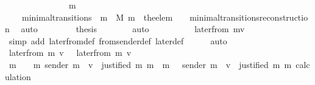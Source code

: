\begin{isabellebody}
\ \ \isamarkupfalse%
\ {\isacharminus}\isanewline
\ \ \ \ \isamarkupfalse%
\ {\isachardoublequoteopen}{\isasymsigma}{\isacharprime}\ {\isacharequal}\ \ {\isasymsigma}\ {\isasymunion}\ {\isacharbraceleft}m{\isacharprime}{\isacharbraceright}{\isachardoublequoteclose}\isanewline
\ \ \ \ \ \ \isamarkupfalse%
\ {\isacartoucheopen}{\isacharparenleft}{\isasymsigma}{\isacharcomma}\ {\isasymsigma}{\isacharprime}{\isacharparenright}\ {\isasymin}\ minimal{\isacharunderscore}transitions\ {\isasymand}\ m\ {\isasymin}\ M{\isacartoucheclose}\ {\isacartoucheopen}m{\isacharprime}\ {\isacharequal}\ the{\isacharunderscore}elem\ {\isacharparenleft}{\isasymsigma}{\isacharprime}\ {\isacharminus}\ {\isasymsigma}{\isacharparenright}{\isacartoucheclose}\ minimal{\isacharunderscore}transitions{\isacharunderscore}reconstruction\ \isamarkupfalse%
\ auto\ \isanewline
\ \ \ \ \isamarkupfalse%
\ \isamarkupfalse%
\ {\isacharquery}thesis\isanewline
\ \ \ \ \ \ \isamarkupfalse%
\ auto\isanewline
\ \ \isamarkupfalse%
\isanewline
\ \ \isamarkupfalse%
\ \isamarkupfalse%
\ {\isachardoublequoteopen}{\isasymdots}\ {\isacharequal}\ later{\isacharunderscore}from\ {\isacharparenleft}m{\isacharcomma}v{\isacharcomma}{\isasymsigma}{\isacharprime}{\isacharparenright}{\isachardoublequoteclose}\isanewline
\ \ \ \ \isamarkupfalse%
\ {\isacharparenleft}simp\ add{\isacharcolon}\ later{\isacharunderscore}from{\isacharunderscore}def\ from{\isacharunderscore}sender{\isacharunderscore}def\ later{\isacharunderscore}def{\isacharparenright}\isanewline
\ \ \ \ \isamarkupfalse%
\ auto\isanewline
\ \ \isamarkupfalse%
\ \isamarkupfalse%
\ {\isachardoublequoteopen}later{\isacharunderscore}from\ {\isacharparenleft}m{\isacharcomma}\ v{\isacharcomma}\ {\isasymsigma}{\isacharparenright}\ {\isacharequal}\ later{\isacharunderscore}from\ {\isacharparenleft}m{\isacharcomma}\ v{\isacharcomma}\ {\isasymsigma}{\isacharprime}{\isacharparenright}{\isachardoublequoteclose}\isanewline
\ \ \ \ \isamarkupfalse%
\ {\isacartoucheopen}{\isacharbraceleft}m{\isacharprime}{\isacharprime}\ {\isasymin}\ {\isasymsigma}\ {\isasymunion}\ {\isacharbraceleft}m{\isacharprime}{\isacharbraceright}{\isachardot}\ sender\ m{\isacharprime}{\isacharprime}\ {\isacharequal}\ v\ {\isasymand}\ justified\ m\ m{\isacharprime}{\isacharprime}{\isacharbraceright}\ {\isacharequal}\ {\isacharbraceleft}m{\isacharprime}{\isacharprime}\ {\isasymin}\ {\isasymsigma}{\isacharprime}{\isachardot}\ sender\ m{\isacharprime}{\isacharprime}\ {\isacharequal}\ v\ {\isasymand}\ justified\ m\ m{\isacharprime}{\isacharprime}{\isacharbraceright}{\isacartoucheclose}\ calculation\ \isamarkupfalse%

\end{isabellebody}
